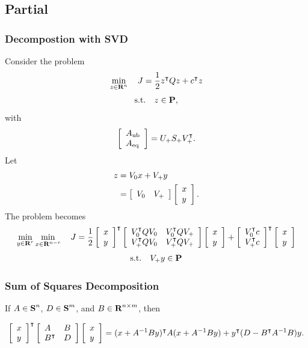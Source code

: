 \documentclass{article}
\begin{document}
\clearpage
\subsection{Partial \QP}
\subsubsection{Decompostion with SVD}
Consider the problem
\begin{align*}
    \min_{z\in\R^{n}}\quad J=\frac{1}{2}z^\tp Q z + c^\tp z
\end{align*}
\begin{align*}
    \st\quad z\in\poly,
\end{align*}
with
\begin{align*}
    \mat{A_\ub\\A_\eq} = \lrs \psv \rrs^\tp.
\end{align*}
Let
\begin{align*}
    z&=\rns x + \rrs y \\
    &= \mat{\rns & \rrs}\mat{x \\ y}.
\end{align*}
The problem becomes 
\begin{align*}
    \min_{y\in\R^r}\min_{x\in\R^{n-r}}\quad J=
    \frac{1}{2}\mat{x \\ y}^\tp 
    \mat{\rns^\tp Q \rns & \rns^\tp Q \rrs \\ 
    \rrs^\tp Q \rns & \rrs^\tp Q \rrs} 
    \mat{x \\ y} 
    +  \mat{\rns^\tp c \\ \rrs^\tp c}^\tp\mat{x \\ y}
\end{align*}
\begin{align*}
    \st \quad\rrs y\in\poly
\end{align*}

\subsubsection{Sum of Squares Decomposition}

    If $A\in\sym^n$, $D\in\sym^m$, and $B\in\R^{n\times m}$, then

    \begin{align*}
        \mat{x\\y}^\tp \mat{A & B \\ B^\tp & D}\mat{x\\y} =
        (x+A^{-1}By)^\tp A (x+A^{-1}By)+y^\tp(D-B^\tp A^{-1} B)y.
    \end{align*}
\end{document}
